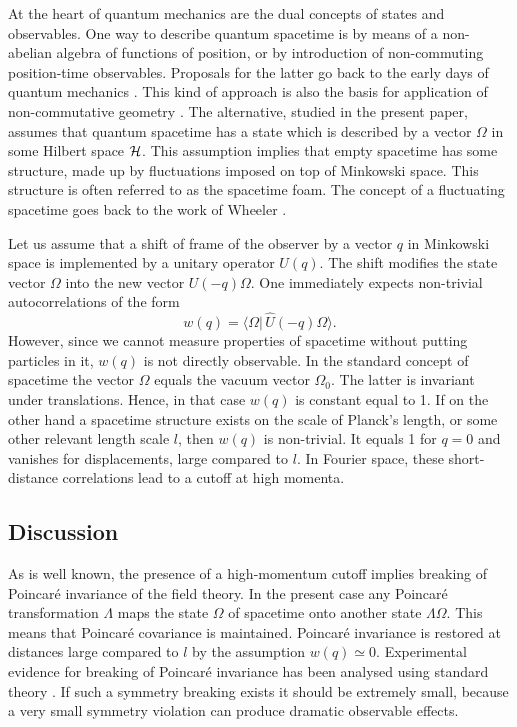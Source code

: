 \documentclass[12pt,a4paper]{article}
\begin{document}
At the heart of quantum mechanics are the dual concepts of 
states and observables. One way to describe quantum spacetime is 
by means of a non-abelian algebra of functions of position, or 
by introduction of non-commuting position-time observables. 
Proposals for the latter go back to the early days of quantum 
mechanics \cite{SHS47}. This kind of approach is also the basis 
for application of non-commutative geometry \cite{CA94}. The 
alternative, studied in the present paper, assumes that quantum 
spacetime has a state which is described by a vector $\Omega$ in 
some Hilbert space $\cal H$. This assumption implies that empty 
spacetime has some structure, made up by fluctuations imposed on 
top of Minkowski space. This structure is often referred to as 
the spacetime foam. The concept of a fluctuating spacetime goes 
back to the work of Wheeler \cite{WJA57}.

Let us assume that a shift of frame of the 
observer by a vector $q$ in Minkowski space is implemented by a 
unitary operator $U(q)$. The shift modifies the state vector $\Omega$ 
into the new vector $U(-q)\Omega$. One immediately expects
non-trivial autocorrelations of the form
\begin{equation}
w(q)=\langle\Omega|\,\hat U(-q)\Omega\rangle.
\label{autocor}
\end{equation}
However, since we cannot measure properties of spacetime without
putting particles in it, $w(q)$ is not directly observable.
In the standard concept of spacetime the vector $\Omega$
equals the vacuum vector $\Omega_0$. The latter is
invariant under translations. Hence, in that case $w(q)$
is constant equal to 1.
If on the other hand a spacetime structure exists on
the scale of Planck's length, or some other relevant
length scale $\mathit l$, then $w(q)$ is non-trivial.
It equals 1 for $q=0$ and vanishes for displacements,
large compared to $\mathit l$. In Fourier space,
these short-distance correlations lead to a cutoff
at high momenta.


\subsection{Discussion}

As is well known, the presence of a high-momentum
cutoff implies breaking of Poincar\'e invariance of the
field theory. In the present case
any Poincar\'e transformation $\Lambda$ maps the
state $\Omega$ of spacetime onto another state $\Lambda\Omega$.
This means that Poincar\'e covariance is maintained.
Poincar\'e invariance is restored at distances large compared to
$\mathit l$ by the assumption $w(q)\simeq 0$.
Experimental evidence for breaking of
Poincar\'e invariance has been analysed using
standard theory \cite {CG99}. If such a symmetry
breaking exists it should be extremely small,
because a very small symmetry violation
can produce dramatic observable effects.
\end{document}
